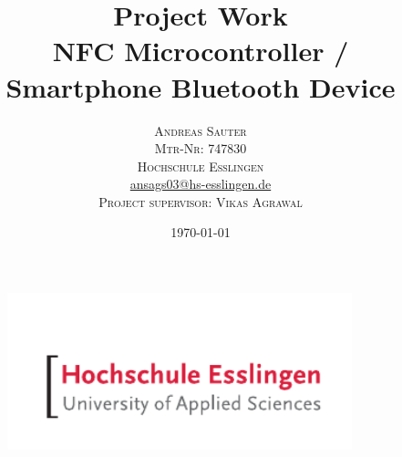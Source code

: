 \documentclass[11pt]{article}
\begin{document}
\title{\vspace{40mm}\fontsize{24pt}{10pt}\selectfont\textbf{Project Work\\NFC Microcontroller / Smartphone Bluetooth Device}} %

\author{
\large
\textsc{Andreas Sauter} \\ %
\textsc{Mtr-Nr: 747830} \\ %
\textsc{Hochschule Esslingen} \\ %
\normalsize 
\href{mailto:ansags03@hs-esslingen.de}{ansags03@hs-esslingen.de}\\ %

\textsc{Project supervisor: Vikas Agrawal}
\vspace{2mm}
}

\date{\today}


\begin{figure}
 \centering
 \includegraphics [width=10cm]{HE_Logo_4c.pdf} 
\end{figure}



\maketitle %

\thispagestyle{empty}
\newpage


\thispagestyle{fancy} %
\setcounter{page}{1} 
\tableofcontents


\newpage

\begin{acronym}
\end{acronym}
\end{document}
